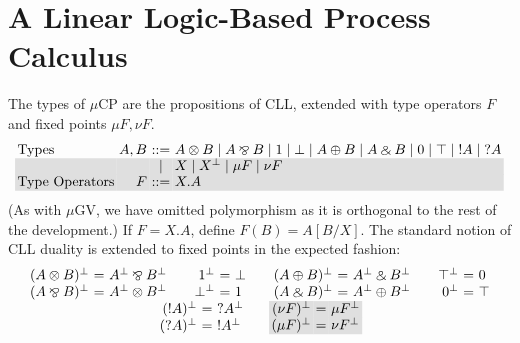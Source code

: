 \documentclass[orivec,envcountsame]{llncs}
\makeatletter
\newcommand{\with}{\mathbin\binampersand}
\newcommand{\parr}{\mathbin\bindnasrepma}
\newcommand{\cpdual}[1]{#1^\perp}
\newcommand{\cpbang}[1]{{! #1}}
\newcommand{\cpquery}[1]{{? #1}}
\newcommand{\mucp}{$\mu\mathrm{CP}$\xspace}
\newcommand{\mugv}{$\mu\mathrm{GV}$\xspace}
\newcommand{\ba}{\begin{array}}
\newcommand{\ea}{\end{array}}
\newenvironment{eqs}{\ba{@{}r@{~}c@{~}l@{}}}{\ea}
\newcommand\shaderow{\noalign{\vskip-0.4pt}\rowcolor{shade}[0.6mm]}
\makeatother
\begin{document}
\section{A Linear Logic-Based Process Calculus}\label{sec:mucp}


The types of \mucp are the propositions of CLL, extended with type operators $F$ and fixed points
$\mu F,\nu F$.
\small\[\begin{array}{@{}l@{~}r@{~}c@{~}l@{}}
  \text{Types} & A,B & ::= & A \otimes B \mid A \parr B \mid 1 \mid \bot \mid A \oplus B \mid A \with B \mid 0 \mid \top
       \mid   \cpbang{A} \mid \cpquery{A} \\ \shaderow
   & & \mid & {X} \mid {\cpdual{X}}
       \mid   {\mu F} \mid {\nu F} \\ \shaderow
   \text{Type Operators} & F & ::= & X.A \\
\end{array}\]\normalsize
(As with \mugv, we have omitted polymorphism as it is orthogonal to the rest of the development.)
If $F = X.A$, define $F(B) = A[B/X]$.  The standard notion of CLL duality is extended to fixed
points in the expected fashion:
\[
\ba{c}
\ba{@{}c@{\qquad}c@{\qquad}c@{\qquad}c@{}}
\begin{eqs}
  \cpdual{(A \otimes B)} &=& \cpdual{A} \parr \cpdual{B} \\
  \cpdual{(A \parr B)} &=& \cpdual{A} \otimes \cpdual{B} \\
\end{eqs}
&
\begin{eqs}
  \cpdual{1} &=& \bot \\
  \cpdual{\bot} &=& 1 \\
\end{eqs}
&
\begin{eqs}
  \cpdual{(A \oplus B)} &=& \cpdual{A} \with \cpdual{B} \\
  \cpdual{(A \with B)} &=& \cpdual{A} \oplus \cpdual{B} \\
\end{eqs}
&
\begin{eqs}
  \cpdual{\top} &=& 0 \\
  \cpdual{0} &=& \top \\
\end{eqs}
\ea
\\
\ba{@{}c@{\qquad}c@{}}
\begin{eqs}
  \cpdual{(\cpbang{A})} &=& \cpquery{\cpdual{A}} \\
  \cpdual{(\cpquery{A})} &=& \cpbang{\cpdual{A}} \\
\end{eqs}
&
\begin{eqs}
  \shaderow \cpdual{(\nu F)} &=& \mu \cpdual{F} \\
  \shaderow \cpdual{(\mu F)} &=& \nu \cpdual{F} \\
\end{eqs} \\
\ea
\ea
\]
\end{document}
